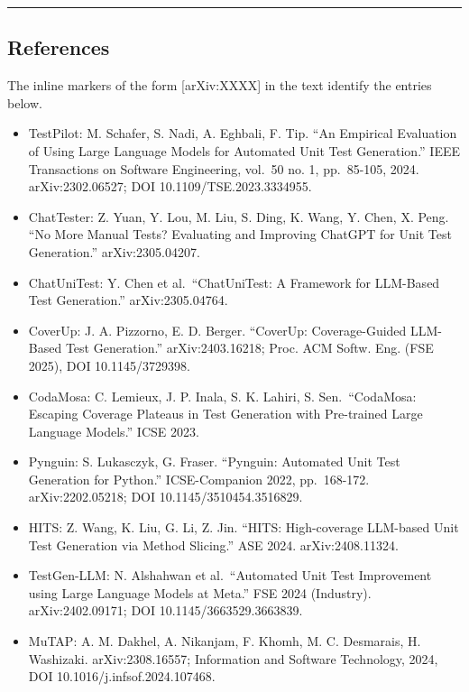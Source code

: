 \documentclass[
  11pt,
]{article}
\providecommand{\tightlist}{%
  \setlength{\itemsep}{0pt}\setlength{\parskip}{0pt}}
\begin{document}
\begin{center}\rule{0.5\linewidth}{0.5pt}\end{center}

\subsection{References}\label{references}

The inline markers of the form {[}arXiv:XXXX{]} in the text identify the
entries below.

\begin{itemize}
\tightlist
\item
  TestPilot: M. Schafer, S. Nadi, A. Eghbali, F. Tip. ``An Empirical
  Evaluation of Using Large Language Models for Automated Unit Test
  Generation.'' IEEE Transactions on Software Engineering, vol.~50 no.
  1, pp.~85-105, 2024. arXiv:2302.06527; DOI 10.1109/TSE.2023.3334955.
\item
  ChatTester: Z. Yuan, Y. Lou, M. Liu, S. Ding, K. Wang, Y. Chen, X.
  Peng. ``No More Manual Tests? Evaluating and Improving ChatGPT for
  Unit Test Generation.'' arXiv:2305.04207.
\item
  ChatUniTest: Y. Chen et al.~``ChatUniTest: A Framework for LLM-Based
  Test Generation.'' arXiv:2305.04764.
\item
  CoverUp: J. A. Pizzorno, E. D. Berger. ``CoverUp: Coverage-Guided
  LLM-Based Test Generation.'' arXiv:2403.16218; Proc. ACM Softw. Eng.
  (FSE 2025), DOI 10.1145/3729398.
\item
  CodaMosa: C. Lemieux, J. P. Inala, S. K. Lahiri, S. Sen.~``CodaMosa:
  Escaping Coverage Plateaus in Test Generation with Pre-trained Large
  Language Models.'' ICSE 2023.
\item
  Pynguin: S. Lukasczyk, G. Fraser. ``Pynguin: Automated Unit Test
  Generation for Python.'' ICSE-Companion 2022, pp.~168-172.
  arXiv:2202.05218; DOI 10.1145/3510454.3516829.
\item
  HITS: Z. Wang, K. Liu, G. Li, Z. Jin. ``HITS: High-coverage LLM-based
  Unit Test Generation via Method Slicing.'' ASE 2024. arXiv:2408.11324.
\item
  TestGen-LLM: N. Alshahwan et al.~``Automated Unit Test Improvement
  using Large Language Models at Meta.'' FSE 2024 (Industry).
  arXiv:2402.09171; DOI 10.1145/3663529.3663839.
\item
  MuTAP: A. M. Dakhel, A. Nikanjam, F. Khomh, M. C. Desmarais, H.
  Washizaki. arXiv:2308.16557; Information and Software Technology,
  2024, DOI 10.1016/j.infsof.2024.107468.

\end{itemize}
\end{document}
